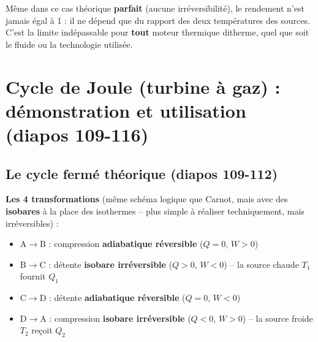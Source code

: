 \begin{retenir}
Même dans ce cas théorique \textbf{parfait} (aucune irréversibilité), le rendement n'est jamais égal à 1 :
il ne dépend que du rapport des deux températures des sources. C'est la limite indépassable pour
\textbf{tout} moteur thermique ditherme, quel que soit le fluide ou la technologie utilisée.
\end{retenir}

\newpage
\section{Cycle de Joule (turbine à gaz) : démonstration et utilisation (diapos 109-116)}

\subsection*{Le cycle fermé théorique (diapos 109-112)}

\textbf{Les 4 transformations} (même schéma logique que Carnot, mais avec des \textbf{isobares} à la place
des isothermes -- plus simple à réaliser techniquement, mais irréversibles) :
\begin{itemize}[leftmargin=1.4em]
\item A$\to$B : compression \textbf{adiabatique réversible} ($Q=0$, $W>0$)
\item B$\to$C : détente \textbf{isobare irréversible} ($Q>0$, $W<0$) -- la source chaude $T_1$ fournit $Q_1$
\item C$\to$D : détente \textbf{adiabatique réversible} ($Q=0$, $W<0$)
\item D$\to$A : compression \textbf{isobare irréversible} ($Q<0$, $W>0$) -- la source froide $T_2$ reçoit
$Q_2$
\end{itemize}

